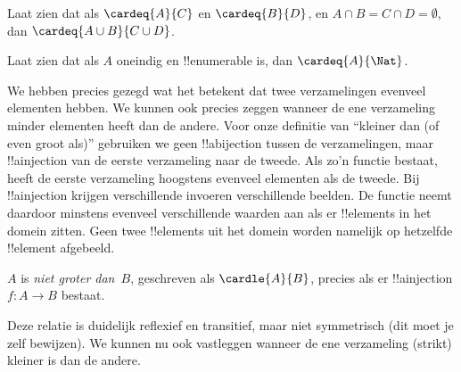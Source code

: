 \documentclass[openany]{memoir}
\begin{document}
\begin{prob}
Laat zien dat als $\cardeq{A}{C}$ en $\cardeq{B}{D}$, en $A \cap B =
C \cap D = \emptyset$, dan $\cardeq{A \cup B}{C \cup D}$.
\end{prob}

\begin{prob}
Laat zien dat als $A$ oneindig en !!{enumerable} is, dan
$\cardeq{A}{\Nat}$.
\end{prob}
\endgroup

\begingroup
\def\olfilename{OLP-0036}
\def\olfilepath{content/sets-functions-relations/size-of-sets/}
\hypertarget{unit-OLP-0036}{}





\begin{explain}
We hebben precies gezegd wat het betekent dat twee verzamelingen evenveel
elementen hebben. We kunnen ook precies zeggen wanneer de ene verzameling
minder elementen heeft dan de andere. Voor onze definitie van ``kleiner dan
(of even groot als)'' gebruiken we geen !!a{bijection} tussen de
verzamelingen, maar !!a{injection} van de eerste verzameling naar de tweede.
Als zo'n functie bestaat, heeft de eerste verzameling hoogstens evenveel
elementen als de tweede. Bij !!a{injection} krijgen verschillende invoeren
verschillende beelden. De functie neemt daardoor minstens evenveel
verschillende waarden aan als er !!{element}s in het domein zitten. Geen twee
!!{element}s uit het domein worden namelijk op hetzelfde !!{element} afgebeeld.
\end{explain}

\begin{defn}
$A$ is \emph{niet groter dan}~$B$, geschreven als $\cardle{A}{B}$, precies
als er !!a{injection} $f \colon A \to B$ bestaat.
\end{defn}

Deze relatie is duidelijk reflexief en transitief, maar niet symmetrisch
(dit moet je zelf bewijzen). We kunnen nu ook vastleggen wanneer de ene
verzameling (strikt) kleiner is dan de andere. 
\end{document}
